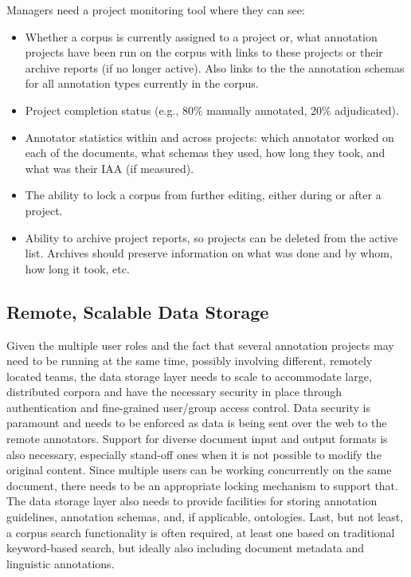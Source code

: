 Managers need a project monitoring tool where they can see: 
\begin{itemize}
\item Whether a corpus is currently assigned to a project or, what annotation projects have been run on the corpus with links to these projects or their archive reports (if no longer active). Also links to the the annotation schemas for all annotation types currently in the corpus. 
\item Project completion status (e.g., 80\% manually annotated, 20\% adjudicated).
\item Annotator statistics within and across projects: which annotator worked on each of the documents, what schemas they used, how long they took, and what was their IAA (if measured).   
\item The ability to lock a corpus from further editing, either during or after a project.
\item Ability to archive project reports, so  projects can be deleted from the active list. Archives should preserve information on what was done and by whom, how long it took, etc.  
\end{itemize}


\subsection{Remote, Scalable Data Storage}\label{sec:remote-data-store}

Given the multiple user roles and the fact that several annotation projects may need to be running at the same time, possibly involving different, remotely located teams, the data storage layer needs to scale to accommodate large, distributed corpora and have the necessary security in place through authentication and fine-grained user/group access control. Data security is paramount and needs to be enforced as data is being sent over the web to the remote annotators. Support for diverse document input and output formats is also necessary, especially stand-off ones when it is not possible to modify the original content. Since multiple users can be working concurrently on the same document, there needs to be an appropriate locking mechanism to support that. The data storage layer also needs to provide facilities for storing annotation guidelines, annotation schemas, and, if applicable, ontologies. Last, but not least, a corpus search functionality is often required, at least one based on traditional keyword-based search, but ideally also including document metadata and linguistic annotations. 

